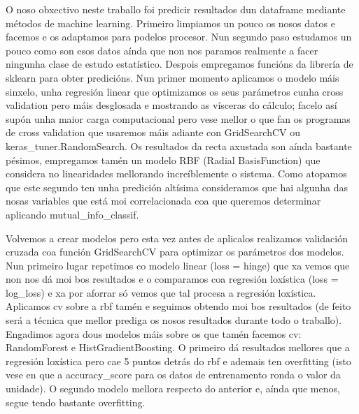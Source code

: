 \documentclass[12pt,a4paper,twoside]{article}
\begin{document}
O noso obxectivo neste traballo foi predicir resultados dun dataframe mediante métodos de machine learning. Primeiro limpiamos un pouco os nosos 
datos e facemos e os adaptamos para podelos procesor. Nun segundo paso estudamos un pouco como son esos datos aínda que non nos paramos realmente
a facer ningunha clase de estudo estatístico. Despois empregamos funcións da librería de sklearn para obter predicións. Nun primer momento aplicamos
o modelo máis sinxelo, unha regresión linear que optimizamos os seus parámetros cunha cross validation pero máis desglosada e mostrando as vísceras 
do cálculo; facelo así supón unha maior carga computacional pero vese mellor o que fan os programas de cross validation que usaremos máis adiante 
con GridSearchCV ou keras\_tuner.RandomSearch. Os resultados da recta axustada son aínda bastante pésimos, empregamos tamén un modelo RBF (Radial 
BasisFunction) que considera no linearidades mellorando increíblemente o sistema. Como atopamos que este segundo ten unha predición altísima consideramos que
hai algunha das nosas variables que está moi correlacionada coa que queremos determinar aplicando mutual\_info\_classif.

Volvemos a crear modelos pero esta vez antes de aplicalos realizamos validación cruzada coa función GridSearchCV para optimizar os parámetros dos modelos. 
Nun primeiro lugar repetimos co modelo linear (loss = hinge) que xa vemos que non nos dá moi bos resultados e o comparamos coa regresión loxística (loss = 
log\_loss) e xa por aforrar só vemos que tal procesa a regresión loxística. Aplicamos cv sobre a rbf tamén e seguimos obtendo moi bos resultados (de feito 
será a técnica que mellor prediga os nosos resultados durante todo o traballo). Engadimos agora dous modelos máis sobre os que tamén facemos cv: RandomForest
e HistGradientBoosting. O primeiro dá resultados mellores que a regresión loxística pero cae 5 puntos detrás do rbf e ademais ten overfitting (isto vese 
en que a accuracy\_score para os datos de entrenamento ronda o valor da unidade). O segundo modelo mellora respecto do anterior e, aínda que menos, segue 
tendo bastante overfitting.
\end{document}
